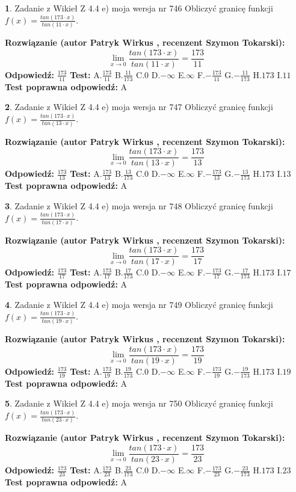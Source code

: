 \documentclass[12pt, a4paper]{article}
\theoremstyle{definition} %
\newtheorem{zad}{}
\newcommand{\zadStart}[1]{\begin{zad}#1\newline}
\newcommand{\zadStop}{\end{zad}}
\newcommand{\rozwStart}[2]{\noindent \textbf{Rozwiązanie (autor #1 , recenzent #2): }\newline}
\newcommand{\rozwStop}{\newline}
\newcommand{\odpStart}{\noindent \textbf{Odpowiedź:}\newline}
\newcommand{\odpStop}{\newline}
\newcommand{\testStart}{\noindent \textbf{Test:}\newline}
\newcommand{\testStop}{\newline}
\newcommand{\kluczStart}{\noindent \textbf{Test poprawna odpowiedź:}\newline}
\newcommand{\kluczStop}{\newline}
\begin{document}
\zadStart{Zadanie z Wikieł Z 4.4 e) moja wersja nr 746}
Obliczyć granicę funkcji $f(x)=\frac{tan(173\cdot x)}{tan(11\cdot x)}$.
\zadStop
\rozwStart{Patryk Wirkus}{Szymon Tokarski}
$$\lim\limits_{x\to 0}\frac{tan(173\cdot x)}{tan(11\cdot x)}=
\frac{173}{11}$$
\rozwStop
\odpStart
$\frac{173}{11}$
\odpStop
\testStart
A.$\frac{173}{11}$
B.$\frac{11}{173}$
C.$0$
D.$-\infty$
E.$\infty$
F.$-\frac{173}{11}$
G.$-\frac{11}{173}$
H.$173$
I.$11$
\testStop
\kluczStart
A
\kluczStop



\zadStart{Zadanie z Wikieł Z 4.4 e) moja wersja nr 747}
Obliczyć granicę funkcji $f(x)=\frac{tan(173\cdot x)}{tan(13\cdot x)}$.
\zadStop
\rozwStart{Patryk Wirkus}{Szymon Tokarski}
$$\lim\limits_{x\to 0}\frac{tan(173\cdot x)}{tan(13\cdot x)}=
\frac{173}{13}$$
\rozwStop
\odpStart
$\frac{173}{13}$
\odpStop
\testStart
A.$\frac{173}{13}$
B.$\frac{13}{173}$
C.$0$
D.$-\infty$
E.$\infty$
F.$-\frac{173}{13}$
G.$-\frac{13}{173}$
H.$173$
I.$13$
\testStop
\kluczStart
A
\kluczStop



\zadStart{Zadanie z Wikieł Z 4.4 e) moja wersja nr 748}
Obliczyć granicę funkcji $f(x)=\frac{tan(173\cdot x)}{tan(17\cdot x)}$.
\zadStop
\rozwStart{Patryk Wirkus}{Szymon Tokarski}
$$\lim\limits_{x\to 0}\frac{tan(173\cdot x)}{tan(17\cdot x)}=
\frac{173}{17}$$
\rozwStop
\odpStart
$\frac{173}{17}$
\odpStop
\testStart
A.$\frac{173}{17}$
B.$\frac{17}{173}$
C.$0$
D.$-\infty$
E.$\infty$
F.$-\frac{173}{17}$
G.$-\frac{17}{173}$
H.$173$
I.$17$
\testStop
\kluczStart
A
\kluczStop



\zadStart{Zadanie z Wikieł Z 4.4 e) moja wersja nr 749}
Obliczyć granicę funkcji $f(x)=\frac{tan(173\cdot x)}{tan(19\cdot x)}$.
\zadStop
\rozwStart{Patryk Wirkus}{Szymon Tokarski}
$$\lim\limits_{x\to 0}\frac{tan(173\cdot x)}{tan(19\cdot x)}=
\frac{173}{19}$$
\rozwStop
\odpStart
$\frac{173}{19}$
\odpStop
\testStart
A.$\frac{173}{19}$
B.$\frac{19}{173}$
C.$0$
D.$-\infty$
E.$\infty$
F.$-\frac{173}{19}$
G.$-\frac{19}{173}$
H.$173$
I.$19$
\testStop
\kluczStart
A
\kluczStop



\zadStart{Zadanie z Wikieł Z 4.4 e) moja wersja nr 750}
Obliczyć granicę funkcji $f(x)=\frac{tan(173\cdot x)}{tan(23\cdot x)}$.
\zadStop
\rozwStart{Patryk Wirkus}{Szymon Tokarski}
$$\lim\limits_{x\to 0}\frac{tan(173\cdot x)}{tan(23\cdot x)}=
\frac{173}{23}$$
\rozwStop
\odpStart
$\frac{173}{23}$
\odpStop
\testStart
A.$\frac{173}{23}$
B.$\frac{23}{173}$
C.$0$
D.$-\infty$
E.$\infty$
F.$-\frac{173}{23}$
G.$-\frac{23}{173}$
H.$173$
I.$23$
\testStop
\kluczStart
A
\kluczStop
\end{document}
